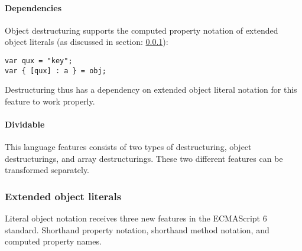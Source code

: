 \paragraph{Dependencies}
Object destructuring supports the computed property notation of extended object literals (as discussed in section: \ref{object-literals}): 

\begin{lstlisting}
var qux = "key";
var { [qux] : a } = obj;
\end{lstlisting}

Destructuring thus has a dependency on extended object literal notation for this feature to work properly.

\paragraph{Dividable}
This language features consists of two types of destructuring, object destructurings, and array destructurings. These two different features can be transformed separately. 

\subsubsection{Extended object literals} \label{object-literals}
Literal object notation receives three new features in the ECMAScript 6 standard\cite[12.2.5]{SpecJS}. Shorthand property notation, shorthand method notation, and computed property names.

